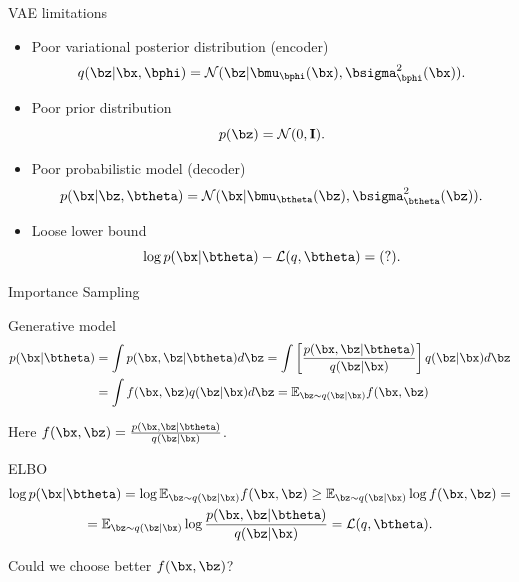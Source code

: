 \begin{frame}{VAE limitations}
	\begin{itemize}
		\item Poor variational posterior distribution (encoder)
		\[
		q(\bz | \bx, \bphi) = \mathcal{N}(\bz| \bmu_{\bphi}(\bx), \bsigma^2_{\bphi}(\bx)).
		\]
		\item Poor prior distribution
		\[
		p(\bz) = \mathcal{N}(0, \mathbf{I}).
		\]
		\item Poor probabilistic model (decoder)
		\[
		p(\bx | \bz, \btheta) = \mathcal{N}(\bx| \bmu_{\btheta}(\bz), \bsigma^2_{\btheta}(\bz)).
		\]
		\item Loose lower bound
		\[
		\log p(\bx | \btheta) - \mathcal{L}(q, \btheta) = (?).
		\]
	\end{itemize}
\end{frame}
\begin{frame}{Importance Sampling}
	\begin{block}{Generative model}
		\vspace{-0.5cm}
		\begin{align*}
			p(\bx | \btheta) &= \int p(\bx, \bz | \btheta) d\bz = \int \left[\frac{p(\bx, \bz | \btheta)}{q(\bz | \bx)} \right] q(\bz | \bx) d\bz \\
			&= \int f(\bx, \bz) q(\bz | \bx) d\bz = \mathbb{E}_{\bz \sim q(\bz | \bx)} f(\bx, \bz)
		\end{align*}
	\end{block}
	Here $f(\bx, \bz) = \frac{p(\bx, \bz | \btheta)}{q(\bz | \bx)}$.
	\begin{block}{ELBO}
		\vspace{-0.5cm}
		\begin{multline*}
			\log p(\bx | \btheta) = \log \mathbb{E}_{\bz \sim q(\bz | \bx)} f(\bx, \bz)
			\geq \mathbb{E}_{\bz \sim q(\bz | \bx)} \log f(\bx, \bz) = \\
			= \mathbb{E}_{\bz \sim q(\bz | \bx)} \log \frac{p(\bx, \bz | \btheta)}{q(\bz | \bx)} = \mathcal{L}(q, \btheta).
		\end{multline*}
	\end{block}
	Could we choose better $f(\bx, \bz)$? 
\end{frame}
